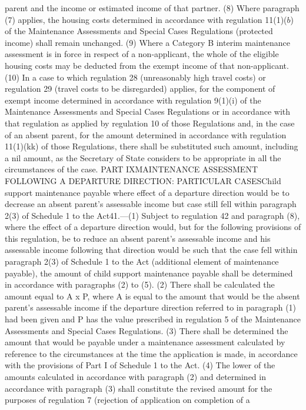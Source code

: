 \documentclass[a4paper]{article}
\begin{document}
parent and the income or estimated income of that partner.
(8) Where paragraph (7) applies, the housing costs determined in accordance with
regulation 11(1)($b$) of the Maintenance Assessments and Special Cases Regulations
(protected income) shall remain unchanged.
(9) Where a Category B interim maintenance assessment is in force in respect of
a non-applicant, the whole of the eligible housing costs may be deducted from
the exempt income of that non-applicant.
(10) In a case to which regulation 28 (unreasonably high travel costs) or
regulation 29 (travel costs to be disregarded) applies, for the component of
exempt income determined in accordance with regulation 9(1)(i) of the
Maintenance Assessments and Special Cases Regulations or in accordance with that
regulation as applied by regulation 10 of those Regulations and, in the case of
an absent parent, for the amount determined in accordance with regulation
11(1)(kk) of those Regulations, there shall be substituted such amount,
including a nil amount, as the Secretary of State considers to be appropriate in
all the circumstances of the case.
PART IXMAINTENANCE ASSESSMENT FOLLOWING A DEPARTURE DIRECTION: PARTICULAR
CASESChild support maintenance payable where effect of a departure direction
would be to decrease an absent parent’s assessable income but case still fell
within paragraph 2(3) of Schedule 1 to the Act41.—(1) Subject to regulation 42
and paragraph (8), where the effect of a departure direction would, but for the
following provisions of this regulation, be to reduce an absent parent’s
assessable income and his assessable income following that direction would be
such that the case fell within paragraph 2(3) of Schedule 1 to the Act
(additional element of maintenance payable), the amount of child support
maintenance payable shall be determined in accordance with paragraphs (2) to
(5).
(2) There shall be calculated the amount equal to A x P, where A is equal to the
amount that would be the absent parent’s assessable income if the departure
direction referred to in paragraph (1) had been given and P has the value
prescribed in regulation 5 of the Maintenance Assessments and Special Cases
Regulations.
(3) There shall be determined the amount that would be payable under a
maintenance assessment calculated by reference to the circumstances at the time
the application is made, in accordance with the provisions of Part I of Schedule
1 to the Act.
(4) The lower of the amounts calculated in accordance with paragraph (2) and
determined in accordance with paragraph (3) shall constitute the revised amount
for the purposes of regulation 7 (rejection of application on completion of a
\end{document}
